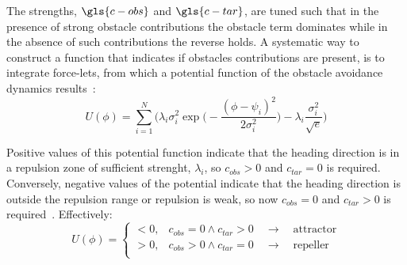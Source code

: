 The strengths, $\gls{c-obs}$ and $\gls{c-tar}$, are tuned such that in the presence of
strong obstacle contributions the obstacle term dominates while in the absence
of such contributions the reverse holds. A systematic way to construct a
function that indicates if obstacles contributions are present, is to integrate
force-lets, from which a potential function of the obstacle avoidance dynamics
results~\cite{bicho2000dynamic}:
\begin{equation}
  \label{eq:40}
  U(\phi) = \sum_{i = 1}^N{ \Bigg( \lambda_i \sigma_i^2  \exp \Big( - \frac{ (\phi -\psi_i)^2 }{2 \sigma_i ^2} \Big) - \lambda_i \frac{\sigma_i ^2}{\sqrt{e}}  \Bigg)  }
\end{equation}

Positive values of this potential function indicate that the heading direction
is in a repulsion zone of sufficient strenght, $\lambda_i$, so $c_{obs} > 0$ and
$c_{tar} = 0$ is required. Conversely, negative values of the potential indicate
that the heading direction is outside the repulsion range or repulsion is weak,
so now $c_{obs} = 0$ and $c_{tar} > 0$ is required~\cite{bicho2000dynamic}. 
Effectively:
\begin{equation}
  \label{eq:41}
  U(\phi) = \left\{
\begin{array}{ll}
      < 0 , & c_{obs} = 0 \wedge c_{tar} > 0 \quad \rightarrow \quad \mathrm{attractor} \\
      > 0 , & c_{obs} > 0 \wedge c_{tar} = 0 \quad \rightarrow \quad \mathrm{repeller} \\
\end{array} 
\right. 
\end{equation}

